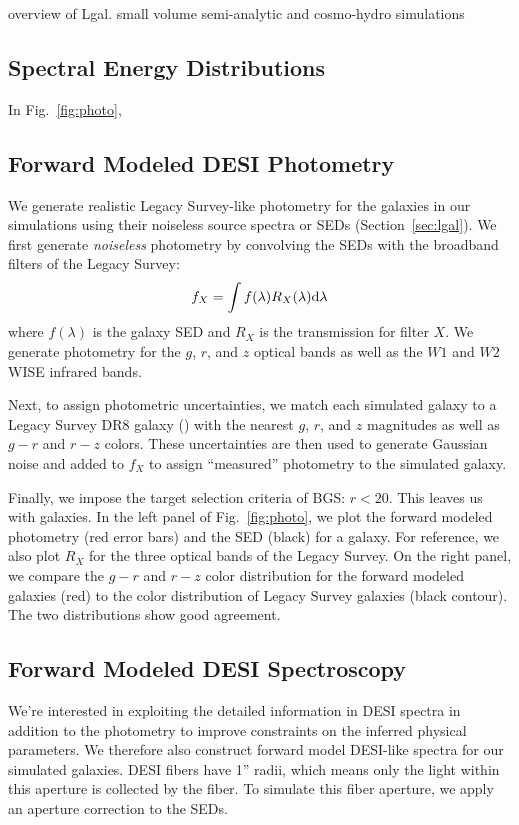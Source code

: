overview of Lgal. small volume semi-analytic and cosmo-hydro simulations


\subsection{Spectral Energy Distributions} \label{sec:sed}
In Fig.~\ref{fig:photo}, 

\subsection{Forward Modeled DESI Photometry} \label{sec:photo} 
We generate realistic Legacy Survey-like photometry for the galaxies in our
simulations using their noiseless source spectra or SEDs
(Section~\ref{sec:lgal}). We first generate {\em noiseless} photometry by
convolving the SEDs with the broadband filters of the Legacy Survey: 
\begin{equation}
     f_X = \int f(\lambda) R_X(\lambda) {\rm d}\lambda
\end{equation}
where $f(\lambda)$ is the galaxy SED and $R_X$ is the transmission for filter
$X$. We generate photometry for the $g$, $r$, and $z$ optical bands as well as
the $W1$ and $W2$ WISE infrared bands.

Next, to assign photometric uncertainties, we match each simulated galaxy
to a Legacy Survey DR8 galaxy 
()
with the nearest $g$, $r$, and $z$ magnitudes as well as $g - r$ and $r - z$
colors. These uncertainties are then used to generate Gaussian noise and added
to $f_X$ to assign ``measured'' photometry to the simulated galaxy. 

Finally, we impose the target selection criteria of BGS: $r < 20$. 
This leaves us with  \lgal galaxies. 
In the left panel of Fig.~\ref{fig:photo}, we plot the forward
modeled photometry (red error bars) and the SED (black) for a \lgal galaxy. 
For reference, we also plot $R_X$ for the three optical bands of the Legacy
Survey. On the right panel, we compare the $g - r$ and $r - z$ color
distribution for the forward modeled \lgal galaxies (red) to the color
distribution of Legacy Survey galaxies (black contour). The two distributions
show good agreement.  

\subsection{Forward Modeled DESI Spectroscopy} \label{sec:spec}
We're interested in exploiting the detailed information in DESI spectra in
addition to the photometry to improve constraints on the inferred physical parameters. 
We therefore also construct forward model DESI-like spectra for our simulated
galaxies. DESI fibers have 1'' radii, which means only the light within this
aperture is collected by the fiber. To simulate this fiber aperture, we apply
an aperture correction to the SEDs. 

